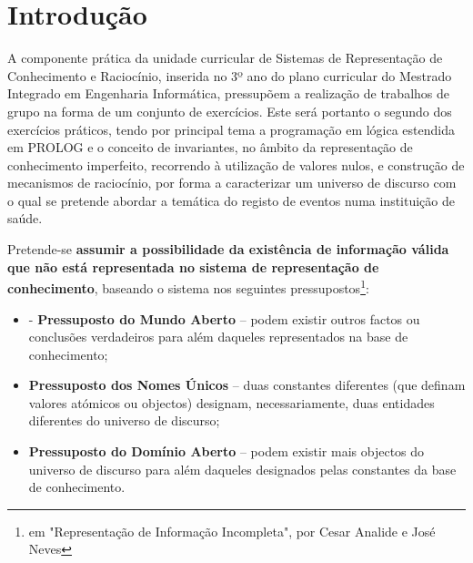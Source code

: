 \documentclass[
  oneside,
  10pt, a4paper,
  footinclude=true,
  headinclude=true,
  cleardoublepage=empty
]{scrbook}
\author{Filipe C. Oliveira, Filipe S. Marques, Luís F. Mendes}
\date{\myear} %
\begin{document}
	\umfrontcover	
	\umtitlepage
	
	
	\cleardoublepage
	
	
	\tableofcontents
	
	
	
	\chapter{Introdução}
		A componente prática da unidade curricular de Sistemas de Representação de Conhecimento e Raciocínio, inserida no 3º ano do plano curricular do Mestrado  Integrado em Engenharia Informática, pressupõem a realização de trabalhos de grupo na forma de um conjunto de exercícios. Este será portanto o segundo dos exercícios práticos, tendo por principal tema a programação em lógica estendida em PROLOG e o conceito de invariantes, no âmbito da representação de conhecimento imperfeito, recorrendo à utilização de valores nulos, e construção de mecanismos de raciocínio, por forma a caracterizar um universo de discurso com o qual se pretende abordar a temática do registo de eventos numa instituição de saúde. \par 
Pretende-se \textbf{assumir a possibilidade da existência de informação válida que não está representada no sistema de representação de conhecimento}, baseando o sistema nos seguintes pressupostos\footnote{em "Representação de Informação Incompleta", por 
Cesar Analide  e José Neves}:
\begin{itemize}
\item - \textbf{Pressuposto do Mundo Aberto} – podem existir outros factos ou conclusões verdadeiros para além daqueles representados na base de
conhecimento;
\item \textbf{Pressuposto dos Nomes Únicos} – duas constantes diferentes (que definam valores atómicos ou objectos) designam, necessariamente, duas
entidades diferentes do universo de discurso;
\item \textbf{Pressuposto do Domínio Aberto} – podem existir mais objectos do universo de discurso para além daqueles designados pelas constantes da base
de conhecimento.
\end{itemize}
\end{document}
